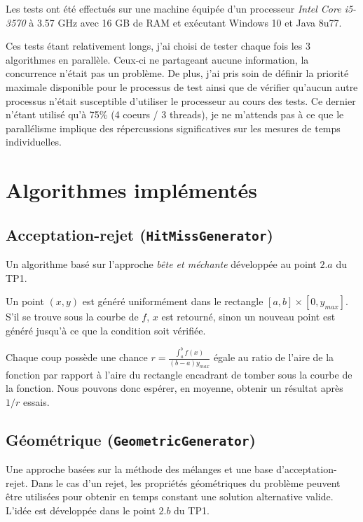 \documentclass[a4paper,11pt]{article}
\begin{document}
Les tests ont été effectués sur une machine équipée d'un processeur \emph{Intel Core i5-3570} à 3.57 GHz avec 16 GB de RAM et exécutant Windows 10 et Java 8u77.

Ces tests étant relativement longs, j'ai choisi de tester chaque fois les 3 algorithmes en parallèle. Ceux-ci ne partageant aucune information, la concurrence n'était pas un problème. De plus, j'ai pris soin de définir la priorité maximale disponible pour le processus de test ainsi que de vérifier qu'aucun autre processus n'était susceptible d'utiliser le processeur au cours des tests. Ce dernier n'étant utilisé qu'à 75\% (4 coeurs / 3 threads), je ne m'attends pas à ce que le parallélisme implique des répercussions significatives sur les mesures de temps individuelles.

\section{Algorithmes implémentés}

\subsection{Acceptation-rejet {\normalfont({\tt HitMissGenerator})}}

Un algorithme basé sur l'approche \emph{bête et méchante} développée au point $2.a$ du TP1.

Un point $(x, y)$ est généré uniformément dans le rectangle $[a, b]\times[0,y_{max}]$. S'il se trouve sous la courbe de $f$, $x$ est retourné, sinon un nouveau point est généré jusqu'à ce que la condition soit vérifiée.

Chaque coup possède une chance $r = \frac{\int_{a}^{b}f(x)}{(b-a) y_{max}}$ égale au ratio de l'aire de la fonction par rapport à l'aire du rectangle encadrant de tomber sous la courbe de la fonction. Nous pouvons donc espérer, en moyenne, obtenir un résultat après $1/r$ essais.

\subsection{Géométrique {\normalfont({\tt GeometricGenerator})}}

Une approche basées sur la méthode des mélanges et une base d'acceptation-rejet. Dans le cas d'un rejet, les propriétés géométriques du problème peuvent être utilisées pour obtenir en temps constant une solution alternative valide. L'idée est développée dans le point $2.b$ du TP1.
\end{document}
